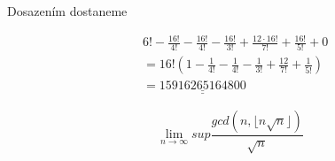 \documentclass[12pt]{article}
\begin{document}
\begin{enumerate}
    Dosazením dostaneme

    \begin{align*}
      &6! - \frac{16!}{4!} - \frac{16!}{4!} - \frac{16!}{3!} + \frac{12\cdot16!}{7!} + \frac{16!}{5!} + 0 \\
      &= 16! (1 - \frac{1}{4!} - \frac{1}{4!} - \frac{1}{3!} + \frac{12}{7!} + \frac{1}{5!}) \\
      &= \underline{\underline{15916265164800}}
    \end{align*}
\end{enumerate}

\[
\lim_{n \to \infty}{sup \frac{gcd(n, \lfloor n\sqrt{n} \rfloor)}{\sqrt{n}}}
\]
\end{document}
